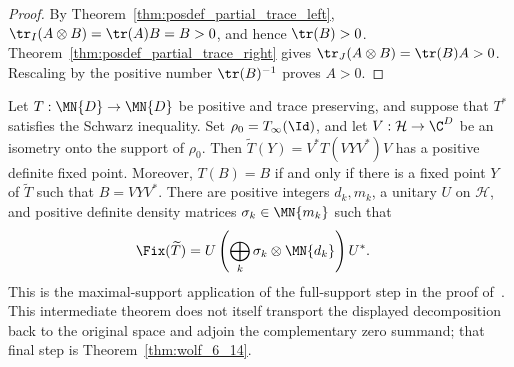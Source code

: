 \begin{proof}
    \leanok
    By Theorem~\ref{thm:posdef_partial_trace_left},
    $\tr_I(A\otimes B)=\tr(A)B=B>0$, and hence $\tr(B)>0$.
    Theorem~\ref{thm:posdef_partial_trace_right} gives
    $\tr_J(A\otimes B)=\tr(B)A>0$. Rescaling by the positive number
    $\tr(B)^{-1}$ proves $A>0$.
\end{proof}

\begin{theorem}%
    \label{thm:maximal_support_compression_density_blocks}
    \leanok
    Let $T:\MN{D}\to\MN{D}$ be positive and trace preserving, and suppose
    that $T^*$ satisfies the Schwarz inequality. Set
    $\rho_0=T_\infty(\Id)$, and let $V:\mathcal H\to\C^D$ be an isometry
    onto the support of $\rho_0$. Then
    $\widetilde T(Y)=V^*T(VYV^*)V$ has a positive definite fixed point.
    Moreover, $T(B)=B$ if and only if there is a fixed point $Y$ of
    $\widetilde T$ such that $B=VYV^*$. There are positive integers
    $d_k,m_k$, a unitary $U$ on $\mathcal H$, and positive definite
    density matrices $\sigma_k\in\MN{m_k}$ such that
    \begin{align}
        \Fix(\widetilde T)
         & =U\left(\bigoplus_k\sigma_k\otimes\MN{d_k}\right)U^*.
        \label{eq:spectral_max_support_blocks}
    \end{align}
    This is the maximal-support application of the full-support step in the
    proof of~\cite[Theorem~6.14]{Wolf2012Quantum}. This intermediate theorem
    does not itself transport the displayed decomposition back to the original
    space and adjoin the complementary zero summand; that final step is
    Theorem~\ref{thm:wolf_6_14}.
\end{theorem}

